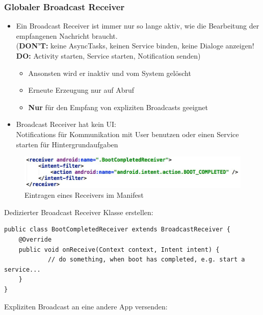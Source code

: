 \documentclass[a4paper]{article}
\begin{document}
		\subsubsection{Globaler Broadcast Receiver}
		
		\begin{itemize}
			
			\item Ein Broadcast Receiver ist immer nur so lange aktiv, wie die Bearbeitung der empfangenen Nachricht braucht.\\
			(\textbf{DON'T:} keine AsyncTasks, keinen Service binden, keine Dialoge anzeigen!\\
			\textbf{DO:} Activity starten, Service starten, Notification senden)
			
			\begin{itemize}
				\item Ansonsten wird er inaktiv und vom System gelöscht
				\item Erneute Erzeugung nur auf Abruf
				\item \textbf{Nur} für den Empfang von expliziten Broadcasts geeignet
			\end{itemize}
			
			\item Broadcast Receiver hat kein UI:\\
			Notifications für Kommunikation mit User benutzen oder einen Service starten für Hintergrundaufgaben
			
		\end{itemize}
	
		\begin{figure}[!htb]
			\centering
			\includegraphics[width=.8\textwidth]{img/br_manifest.jpg}
			\caption{Eintragen eines Receivers im Manifest}
			\label{fig:br_manifest}
		\end{figure}
		\noindent
		Dedizierter Broadcast Receiver Klasse erstellen:
		
		\begin{lstlisting}
public class BootCompletedReceiver extends BroadcastReceiver {
	@Override
	public void onReceive(Context context, Intent intent) {
			// do something, when boot has completed, e.g. start a service...
	}
}
		\end{lstlisting}
		\noindent
		Expliziten Broadcast an eine andere App versenden:
		
\end{document}
